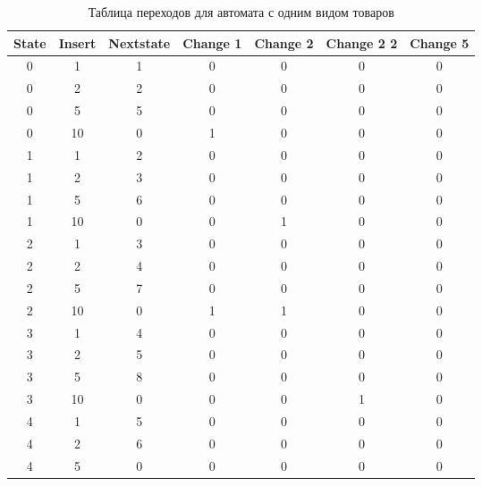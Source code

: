 \begingroup
\renewcommand\arraystretch{0.7}
\begin{longtable}[c]{|c|c|c|c|c|c|c|}
\caption{Таблица переходов для автомата с одним видом товаров}
\\
\hline
State & Insert & Nextstate & Change 1 & Change 2 & Change 2 2 & Change 5 \\ \hline
\endfirsthead
\endhead
0     & 1      & 1         & 0        & 0        & 0          & 0        \\ \hline
0     & 2      & 2         & 0        & 0        & 0          & 0        \\ \hline
0     & 5      & 5         & 0        & 0        & 0          & 0        \\ \hline
0     & 10     & 0         & 1        & 0        & 0          & 0        \\ \hline
1     & 1      & 2         & 0        & 0        & 0          & 0        \\ \hline
1     & 2      & 3         & 0        & 0        & 0          & 0        \\ \hline
1     & 5      & 6         & 0        & 0        & 0          & 0        \\ \hline
1     & 10     & 0         & 0        & 1        & 0          & 0        \\ \hline
2     & 1      & 3         & 0        & 0        & 0          & 0        \\ \hline
2     & 2      & 4         & 0        & 0        & 0          & 0        \\ \hline
2     & 5      & 7         & 0        & 0        & 0          & 0        \\ \hline
2     & 10     & 0         & 1        & 1        & 0          & 0        \\ \hline
3     & 1      & 4         & 0        & 0        & 0          & 0        \\ \hline
3     & 2      & 5         & 0        & 0        & 0          & 0        \\ \hline
3     & 5      & 8         & 0        & 0        & 0          & 0        \\ \hline
3     & 10     & 0         & 0        & 0        & 1          & 0        \\ \hline
4     & 1      & 5         & 0        & 0        & 0          & 0        \\ \hline
4     & 2      & 6         & 0        & 0        & 0          & 0        \\ \hline
4     & 5      & 0         & 0        & 0        & 0          & 0        \\ \hline

\end{longtable}
